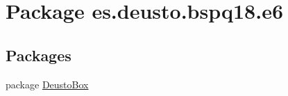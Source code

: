 \hypertarget{namespacees_1_1deusto_1_1bspq18_1_1e6}{}\section{Package es.\+deusto.\+bspq18.\+e6}
\label{namespacees_1_1deusto_1_1bspq18_1_1e6}
\subsection*{Packages}
\begin{DoxyCompactItemize}
\item 
package \mbox{\hyperlink{namespacees_1_1deusto_1_1bspq18_1_1e6_1_1_deusto_box}{Deusto\+Box}}
\end{DoxyCompactItemize}
